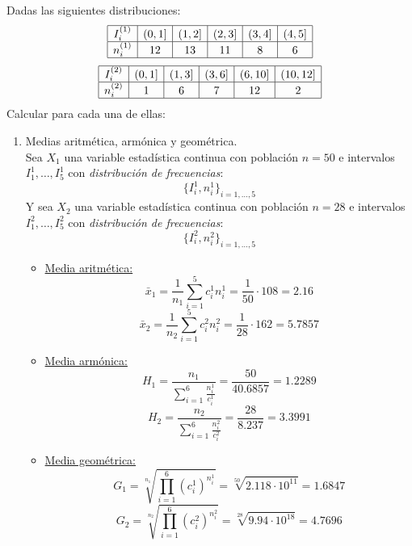 \begin{ejercicio}
    Dadas las siguientes distribuciones:
    \begin{equation*}
        \begin{array}{|c|c|c|c|c|c|}
            \hline
            I_i^{(1)} & (0,1] & (1,2] & (2,3] & (3,4] & (4,5]  \\ \hline
            n_i^{(1)} & 12& 13 & 11 & 8 & 6 \\ \hline 
        \end{array}
    \end{equation*}
    \begin{equation*}
        \begin{array}{|c|c|c|c|c|c|}
            \hline
            I_i^{(2)} & (0,1] & (1,3] & (3,6] & (6,10] & (10,12]  \\ \hline
            n_i^{(2)} & 1& 6 & 7 & 12 & 2 \\ \hline 
        \end{array}
    \end{equation*}
    Calcular para cada una de ellas:
    \begin{enumerate}
        \item Medias aritmética, armónica y geométrica. \\
        Sea $X_1$ una variable estadística continua con población $n=50$ e intervalos $I_1^1, \dots, I_5^1$ con \emph{distribución de frecuencias}:
        $$\{I_i^1, n_i^1\}_{i=1, \dots, 5}$$
        Y sea $X_2$ una variable estadística continua con población $n=28$ e intervalos $I_1^2, \dots, I_5^2$ con \emph{distribución de frecuencias}:
        $$\{I_i^2, n_i^2\}_{i=1, \dots, 5}$$
        \begin{itemize}
            \item \underline{Media aritmética:}\\
            $$\bar{x}_1 = \frac{1}{n_1}\sum_{i=1}^5 c_i^1n_i^1 = \frac{1}{50}\cdot 108 = 2.16$$
            $$\bar{x}_2 = \frac{1}{n_2}\sum_{i=1}^5 c_i^2n_i^2 = \frac{1}{28}\cdot 162 = 5.7857$$

            \item \underline{Media armónica:}\\
            $$H_1 = \frac{n_1}{\sum_{i=1}^6 \frac{n_i^1}{c_i^1}} = \frac{50}{40.6857} = 1.2289$$
            $$H_2 = \frac{n_2}{\sum_{i=1}^6 \frac{n_i^2}{c_i^2}} = \frac{28}{8.237} = 3.3991$$

            \item \underline{Media geométrica:}\\
            $$G_1 = \sqrt[n_1]{\prod_{i=1}^6 (c_i^1)^{n_i^1}} = \sqrt[50]{2.118 \cdot 10^{11}} = 1.6847$$
            $$G_2 = \sqrt[n_2]{\prod_{i=1}^6 (c_i^2)^{n_i^2}} = \sqrt[28]{9.94 \cdot 10^{18}} = 4.7696$$
            

\end{itemize}
\end{enumerate}
\end{ejercicio}
